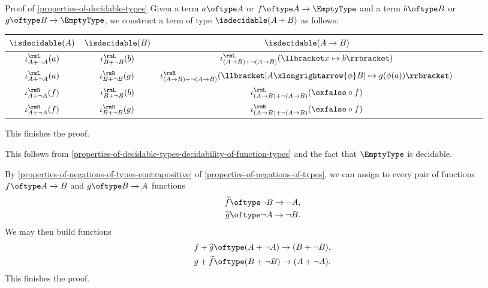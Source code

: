 \begin{Proof}{Proof of \cref{properties-of-decidable-types}}
    Given a term $a\oftype A$ or $f\oftype A\to\EmptyType$ and a term $b\oftype B$ or $g\oftype B\to\EmptyType$, we construct a term of type $\isdecidable(A+B)$ as follows:
    \begingroup%
    \renewcommand{\arraystretch}{1.2}
    \begin{center}
        \begin{tabular}{|Sc|Sc|Sc|}\hline{}
            $\isdecidable(A)$            & $\isdecidable(B)$            & $\isdecidable(A\to B)$                                                                                   \\\hline{}
            $\iota^{\rmL}_{A+\neg A}(a)$ & $\iota^{\rmL}_{B+\neg B}(b)$ & $\iota^{\rmL}_{(A\to B)+\neg(A\to B)}(\llbracket x\mapsto b\rrbracket)$                                  \\
            $\iota^{\rmL}_{A+\neg A}(a)$ & $\iota^{\rmR}_{B+\neg B}(g)$ & $\iota^{\rmR}_{(A\to B)+\neg(A\to B)}(\llbracket[A\xlongrightarrow{\phi}B]\mapsto g(\phi(a))\rrbracket)$ \\
            $\iota^{\rmR}_{A+\neg A}(f)$ & $\iota^{\rmL}_{B+\neg B}(b)$ & $\iota^{\rmL}_{(A\to B)+\neg(A\to B)}(\exfalso\circ f)$                                                  \\
            $\iota^{\rmR}_{A+\neg A}(f)$ & $\iota^{\rmR}_{B+\neg B}(g)$ & $\iota^{\rmR}_{(A\to B)+\neg(A\to B)}(\exfalso\circ f)$                                                  \\\hline
        \end{tabular}
    \end{center}
    \endgroup
    This finishes the proof.

    This follows from \cref{properties-of-decidable-types-decidability-of-function-types} and the fact that $\EmptyType$ is decidable.

    By \cref{properties-of-negations-of-types-contrapositive} of \cref{properties-of-negations-of-types}, we can assign to every pair of functions $f\oftype A\to B$ and $g\oftype B\to A$ functions
    \begin{align*}
        \widetilde{f} &\oftype\neg B\to\neg A,\\
        \widetilde{g} &\oftype\neg A\to\neg B.
    \end{align*}
    We may then build functions
    \begin{align*}
        f+\widetilde{g} &\oftype (A+\neg A)\to(B+\neg B),\\
        g+\widetilde{f} &\oftype (B+\neg B)\to(A+\neg A).
    \end{align*}
    This finishes the proof.
\end{Proof}
